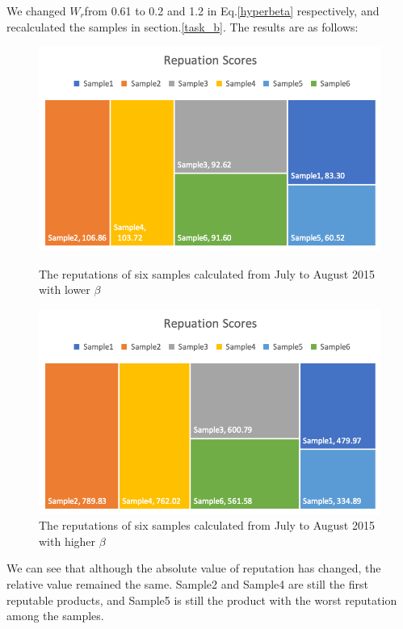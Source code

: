 \documentclass{mcmthesis}
\begin{document}
We changed $W_{r}$from 0.61 to 0.2 and 1.2 in Eq.\ref{hyperbeta} respectively, and recalculated the samples in section.\ref{task_b}. The results are as follows:
\begin{figure}[H] 
\begin{minipage}[t]{0.48\linewidth}	
	\centering 
	\includegraphics[width=1\textwidth]{figures/reputations_n.png} 
	\caption{The reputations of six samples calculated from July to August 2015 with lower $\beta$}
	\label{reputations_n} %
\end{minipage}
\hfill
\begin{minipage}[t]{0.48\linewidth}	
	\centering 
	\includegraphics[width=1\textwidth]{figures/reputations_nn.png} 
	\caption{The reputations of six samples calculated from July to August 2015 with higher $\beta$}
	\label{reputations_nn} %
\end{minipage}
\end{figure}

We can see that although the absolute value of reputation has changed, the relative value remained the same. Sample2 and Sample4 are still the first reputable products, and Sample5 is still the product with the worst reputation among the samples.
\end{document}
